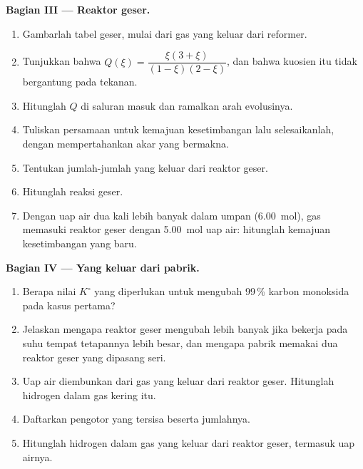 \begin{problem}
\medskip
\noindent\textbf{Bagian III --- Reaktor geser.}
\begin{enumerate}[resume]
  \item Gambarlah tabel  geser, mulai dari gas yang keluar
        dari reformer.
  \item Tunjukkan bahwa $Q(\xi) = \dfrac{\xi(3 + \xi)}{(1 - \xi)(2 - \xi)}$,
        dan bahwa kuosien itu tidak bergantung pada tekanan.
  \item Hitunglah $Q$ di saluran masuk dan ramalkan arah evolusinya.
  \item Tuliskan persamaan untuk kemajuan kesetimbangan lalu
        selesaikanlah, dengan mempertahankan akar yang bermakna.
  \item Tentukan jumlah-jumlah yang keluar dari reaktor geser.
  \item Hitunglah  reaksi geser.
  \item Dengan uap air dua kali lebih banyak dalam umpan
        (\qty{6.00}{mol}), gas memasuki reaktor geser dengan
        \qty{5.00}{mol} uap air: hitunglah kemajuan kesetimbangan yang
        baru.
\end{enumerate}

\medskip
\noindent\textbf{Bagian IV --- Yang keluar dari pabrik.}
\begin{enumerate}[resume]
  \item Berapa nilai $K^\circ$ yang diperlukan untuk mengubah 99\,\%
        karbon monoksida pada kasus pertama?
  \item Jelaskan mengapa reaktor geser mengubah lebih banyak jika bekerja
        pada suhu tempat tetapannya lebih besar, dan mengapa pabrik
        memakai dua reaktor geser yang dipasang seri.
  \item Uap air diembunkan dari gas yang keluar dari reaktor geser.
        Hitunglah  hidrogen dalam gas kering itu.
  \item Daftarkan pengotor yang tersisa beserta jumlahnya.
  \item Hitunglah  hidrogen dalam gas yang keluar dari reaktor
        geser, termasuk uap airnya.
\end{enumerate}
\end{problem}
